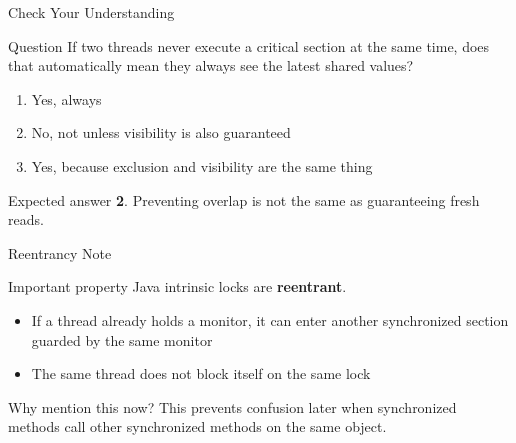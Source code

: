 \documentclass[aspectratio=169,11pt]{beamer}
\begin{document}
	\begin{frame}{Check Your Understanding}
		\begin{block}{Question}
			If two threads never execute a critical section at the same time, does that automatically mean they always see the latest shared values?
		\end{block}
		
		\bigskip
		
		\begin{enumerate}
			\item Yes, always
			\item No, not unless visibility is also guaranteed
			\item Yes, because exclusion and visibility are the same thing
		\end{enumerate}
		
		\bigskip
		
		\begin{alertblock}{Expected answer}
			\textbf{2}. Preventing overlap is not the same as guaranteeing fresh reads.
		\end{alertblock}
	\end{frame}
	
	\begin{frame}{Reentrancy Note}
		\begin{block}{Important property}
			Java intrinsic locks are \textbf{reentrant}.
		\end{block}
		
		\bigskip
		
		\begin{itemize}
			\item If a thread already holds a monitor, it can enter another synchronized section guarded by the same monitor
			\item The same thread does not block itself on the same lock
		\end{itemize}
		
		\bigskip
		
		\begin{alertblock}{Why mention this now?}
			This prevents confusion later when synchronized methods call other synchronized methods on the same object.
		\end{alertblock}
	\end{frame}
	
\end{document}
